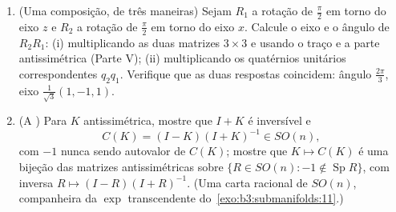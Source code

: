 \begin{problem}
\begin{enumerate}[resume]
  \item (Uma composição, de três maneiras) Sejam $R_1$ a rotação de
        $\frac\pi2$ em torno do eixo $z$ e $R_2$ a rotação de $\frac\pi2$ em
        torno do eixo $x$. Calcule o eixo e o ângulo de $R_2R_1$:
        (i) multiplicando as duas matrizes $3\times3$ e usando o traço e a
        parte antissimétrica (Parte V); (ii) multiplicando os quatérnios
        unitários correspondentes $q_2q_1$. Verifique que as duas
        respostas coincidem: ângulo $\frac{2\pi}3$, eixo $\frac1{\sqrt3}(1, -1, 1)$.
  \item (A ) Para $K$ antissimétrica, mostre
        que $I + K$ é inversível e
        \[
        C(K) = (I - K)(I + K)^{-1} \in SO(n),
        \]
        com $-1$ nunca sendo autovalor de $C(K)$; mostre que
        $K \mapsto C(K)$ é uma bijeção das matrizes antissimétricas sobre $\{R \in SO(n) : -1 \notin
        \operatorname{Sp}R\}$, com
        inversa $R \mapsto (I -
        R)(I + R)^{-1}$. (Uma carta racional de $SO(n)$, companheira da
        $\exp$ transcendente do~\cref{exo:b3:submanifolds:11}.)
\end{enumerate}
\end{problem}
